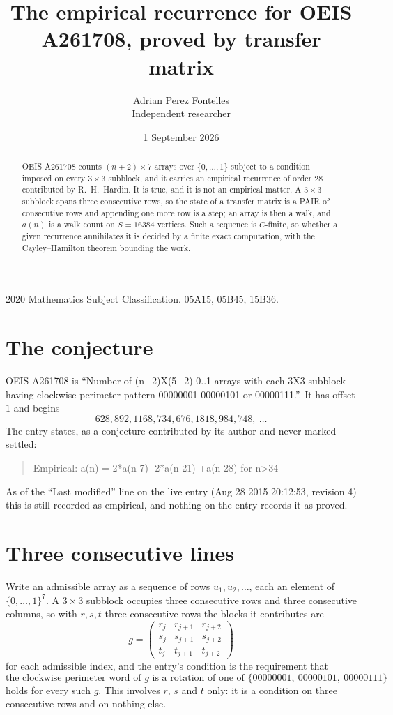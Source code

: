 \documentclass[11pt,a4paper]{article}
\title{The empirical recurrence for OEIS A261708, proved by transfer matrix}
\author{Adrian Perez Fontelles\\ \small Independent researcher}
\date{1 September 2026}
\theoremstyle{plain}
\theoremstyle{definition}
\begin{document}
\maketitle

\begin{abstract}
OEIS A261708 counts $(n+2)\times7$ arrays over $\{0,\dots,1\}$ subject to a condition imposed on
every $3\times3$ subblock, and it carries an empirical recurrence of order $28$
contributed by R.~H.~Hardin. It is true, and it is not an empirical matter. A $3\times3$
subblock spans three consecutive rows, so the state of a transfer matrix is a PAIR of
consecutive rows and appending one more row is a step; an array is then a walk, and
$a(n)$ is a walk count on $S=16384$ vertices. Such a sequence is $C$-finite, so whether a given
recurrence annihilates it is decided by a finite exact computation, with the Cayley--Hamilton
theorem bounding the work.
\end{abstract}

\noindent\small 2020 Mathematics Subject Classification. 05A15, 05B45, 15B36.\normalsize

\section{The conjecture}

OEIS A261708 is ``Number of (n+2)X(5+2) 0..1 arrays with each 3X3 subblock having clockwise perimeter pattern 00000001 00000101 or 00000111.''. It has offset $1$ and begins
\[
628, 892, 1168, 734, 676, 1818, 984, 748,\ \dots
\]
The entry states, as a conjecture contributed by its author and never marked settled:
\begin{quote}
Empirical: a(n) = 2*a(n-7) -2*a(n-21) +a(n-28) for n>34
\end{quote}
As of the ``Last modified'' line on the live entry (Aug 28 2015 20:12:53, revision 4) this is still
recorded as empirical, and nothing on the entry records it as proved.

\section{Three consecutive lines}

Write an admissible array as a sequence of rows $u_1,u_2,\dots$, each an element of
$\{0,\dots,1\}^{7}$. A $3\times3$ subblock occupies three consecutive rows and
three consecutive columns, so with $r,s,t$ three consecutive rows the blocks it
contributes are
\[
g=\begin{pmatrix}r_j&r_{j+1}&r_{j+2}\\ s_j&s_{j+1}&s_{j+2}\\ t_j&t_{j+1}&t_{j+2}\end{pmatrix}
\]
for each admissible index, and the entry's condition is the requirement that
\[
\text{the clockwise perimeter word of }g\text{ is a rotation of one of }\{00000001,\ 00000101,\ 00000111\}
\]
holds for every such $g$. This involves $r$, $s$ and $t$ only: it is a condition on
three consecutive rows and on nothing else.
\end{document}
